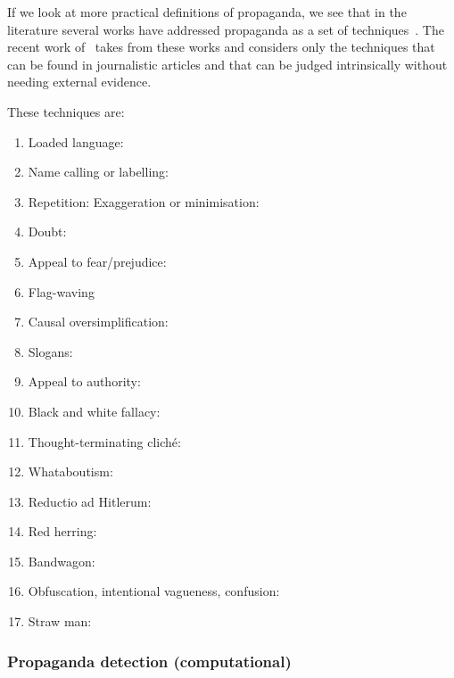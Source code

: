 If we look at more practical definitions of propaganda, we see that in the literature several works have addressed propaganda as a set of techniques~\citep{torok2015symbiotic,miller1939techniques,weston2018rulebook}. The recent work of~\citet{da2019fine} takes from these works and considers only the techniques that can be found in journalistic articles and that can be judged intrinsically without needing external evidence.

These techniques are:
\begin{enumerate}
    \item Loaded language:
    \item Name calling or labelling:
    \item Repetition: Exaggeration or minimisation:
    \item Doubt:
    \item Appeal to fear/prejudice:
    \item Flag-waving
    \item Causal oversimplification:
    \item Slogans: 
    \item Appeal to authority: 
    \item Black and white fallacy:
    \item Thought-terminating cliché:
    \item Whataboutism: 
    \item Reductio ad Hitlerum: 
    \item Red herring: 
    \item Bandwagon: 
    \item Obfuscation, intentional vagueness, confusion: 
    \item Straw man: 
\end{enumerate}



\subsubsection{Propaganda detection (computational)}
\label{ssec:lit_propaganda_detection}




